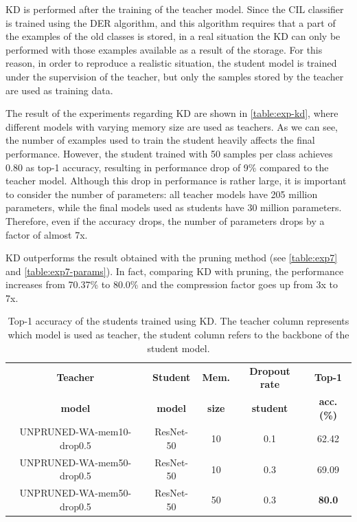 KD is performed after the training of the teacher model. Since the CIL classifier is trained using the DER algorithm, and this algorithm requires that a part of the examples of the old classes is stored, in a real situation the KD can only be performed with those examples available as a result of the storage. For this reason, in order to reproduce a realistic situation, the student model is trained under the supervision of the teacher, but only the samples stored by the teacher are used as training data.

The result of the experiments regarding KD are shown in \autoref{table:exp-kd}, where different models with varying memory size are used as teachers. As we can see, the number of examples used to train the student heavily affects the final performance.
However, the student trained with 50 samples per class achieves 0.80 as top-1 accuracy, resulting in performance drop of 9\% compared to the teacher model. Although this drop in performance is rather large, it is important to consider the number of parameters: all teacher models have 205 million parameters, while the final models used as students have 30 million parameters.
Therefore, even if the accuracy drops, the number of parameters drops by a factor of almost 7x.

KD outperforms the result obtained with the pruning method (see \autoref{table:exp7} and \autoref{table:exp7-params}). In fact, comparing KD with pruning, the performance increases from 70.37\% to 80.0\% and the compression factor goes up from 3x to 7x.


\begin{table}[H]
    \centering
    \begin{tabular}{c|c|c|c|c}
        \hline
        \textbf{Teacher} &
        \textbf{Student} &
        \textbf{Mem.} &
        \textbf{Dropout rate} &
        \textbf{Top-1} \\
        \textbf{model} &
        \textbf{model} &
        \textbf{size} &
        \textbf{student} &
        \textbf{acc. (\%)} \\
        \hline
        \hline
UNPRUNED-WA-mem10-drop0.5&ResNet-50&10&0.1&62.42\\
UNPRUNED-WA-mem50-drop0.5&ResNet-50&10&0.3&69.09\\
UNPRUNED-WA-mem50-drop0.5&ResNet-50&50&0.3&\textbf{80.0}\\
\hline
\end{tabular}
\caption{Top-1 accuracy of the students trained using KD. The teacher column represents which model is used as teacher, the student column refers to the backbone of the student model. }
    \label{table:exp-kd}
\end{table}


